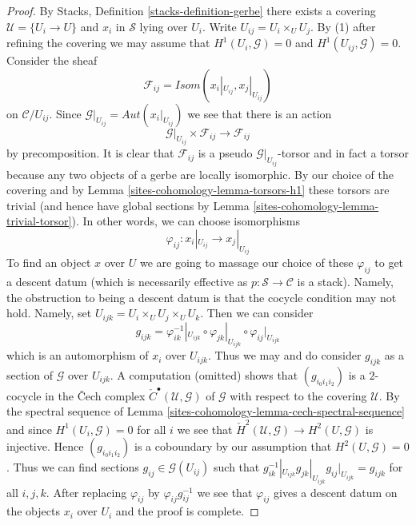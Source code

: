 \begin{proof}
By Stacks, Definition \ref{stacks-definition-gerbe}
there exists a covering $\mathcal{U} = \{U_i \to U\}$
and $x_i$ in $\mathcal{S}$ lying over $U_i$.
Write $U_{ij} = U_i \times_U U_j$. By (1) after refining the covering
we may assume that $H^1(U_i, \mathcal{G}) = 0$ and
$H^1(U_{ij}, \mathcal{G}) = 0$.
Consider the sheaf
$$
\mathcal{F}_{ij} =
\mathit{Isom}(x_i|_{U_{ij}}, x_j|_{U_{ij}})
$$
on $\mathcal{C}/U_{ij}$. Since
$\mathcal{G}|_{U_{ij}} = \mathit{Aut}(x_i|_{U_{ij}})$ we see that there
is an action
$$
\mathcal{G}|_{U_{ij}} \times \mathcal{F}_{ij} \to \mathcal{F}_{ij}
$$
by precomposition. It is clear that $\mathcal{F}_{ij}$ is a
pseudo $\mathcal{G}|_{U_{ij}}$-torsor and in fact a torsor because
any two objects of a gerbe are locally isomorphic.
By our choice of the covering and by
Lemma \ref{sites-cohomology-lemma-torsors-h1}
these torsors are trivial (and hence have global sections by
Lemma \ref{sites-cohomology-lemma-trivial-torsor}).
In other words, we can choose isomorphisms
$$
\varphi_{ij} : x_i|_{U_{ij}} \longrightarrow x_j|_{U_{ij}}
$$
To find an object $x$ over $U$ we are going to massage our choice
of these $\varphi_{ij}$ to get a descent datum (which is necessarily
effective as $p : \mathcal{S} \to \mathcal{C}$ is a stack).
Namely, the obstruction to being a descent datum is that the cocycle
condition may not hold. Namely, set $U_{ijk} = U_i \times_U U_j \times_U U_k$.
Then we can consider
$$
g_{ijk} = \varphi_{ik}^{-1}|_{U_{ijk}} \circ \varphi_{jk}|_{U_{ijk}} \circ
\varphi_{ij}|_{U_{ijk}}
$$
which is an automorphism of $x_i$ over $U_{ijk}$. Thus we may and do
consider $g_{ijk}$ as a section of $\mathcal{G}$ over $U_{ijk}$.
A computation (omitted) shows that $(g_{i_0i_1i_2})$ is a $2$-cocycle
in the {\v C}ech complex ${\check C}^\bullet(\mathcal{U}, \mathcal{G})$
of $\mathcal{G}$ with respect to the covering $\mathcal{U}$.
By the spectral sequence of
Lemma \ref{sites-cohomology-lemma-cech-spectral-sequence}
and since $H^1(U_i, \mathcal{G}) = 0$ for all $i$
we see that ${\check H}^2(\mathcal{U}, \mathcal{G}) \to H^2(U, \mathcal{G})$
is injective. Hence $(g_{i_0i_1i_2})$ is a coboundary
by our assumption that $H^2(U, \mathcal{G}) = 0$.
Thus we can find sections $g_{ij} \in \mathcal{G}(U_{ij})$ such that
$g_{ik}^{-1}|_{U_{ijk}} g_{jk}|_{U_{ijk}}  g_{ij}|_{U_{ijk}} = g_{ijk}$
for all $i, j, k$.
After replacing $\varphi_{ij}$ by $\varphi_{ij}g_{ij}^{-1}$
we see that $\varphi_{ij}$ gives a descent datum on the objects
$x_i$ over $U_i$ and the proof is complete.
\end{proof}

